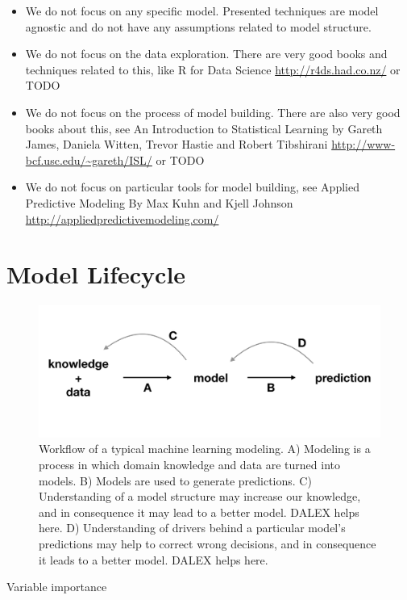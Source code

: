 \documentclass[]{book}
\providecommand{\tightlist}{%
  \setlength{\itemsep}{0pt}\setlength{\parskip}{0pt}}
\theoremstyle{definition}
\theoremstyle{definition}
\theoremstyle{definition}
\theoremstyle{remark}
\begin{document}
\begin{itemize}
\tightlist
\item
  We do not focus on any specific model. Presented techniques are model
  agnostic and do not have any assumptions related to model structure.
\item
  We do not focus on the data exploration. There are very good books and
  techniques related to this, like R for Data Science
  \url{http://r4ds.had.co.nz/} or TODO
\item
  We do not focus on the process of model building. There are also very
  good books about this, see An Introduction to Statistical Learning by
  Gareth James, Daniela Witten, Trevor Hastie and Robert Tibshirani
  \url{http://www-bcf.usc.edu/~gareth/ISL/} or TODO
\item
  We do not focus on particular tools for model building, see Applied
  Predictive Modeling By Max Kuhn and Kjell Johnson
  \url{http://appliedpredictivemodeling.com/}
\end{itemize}

\hypertarget{model-lifecycle}{%
\section{Model Lifecycle}\label{model-lifecycle}}

\begin{figure}
\centering
\includegraphics{figure/mp_understanding.png}
\caption{Workflow of a typical machine learning modeling. A) Modeling is
a process in which domain knowledge and data are turned into models. B)
Models are used to generate predictions. C) Understanding of a model
structure may increase our knowledge, and in consequence it may lead to
a better model. DALEX helps here. D) Understanding of drivers behind a
particular model's predictions may help to correct wrong decisions, and
in consequence it leads to a better model. DALEX helps here.}
\end{figure}

Variable importance
\end{document}
